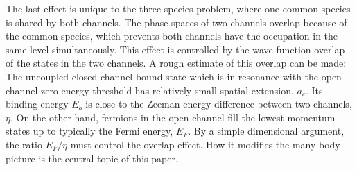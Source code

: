 \documentclass[reprint,pra]{revtex4-1}
\providecommand{\abs}[1]{\ensuremath{\left\lvert{#1}\right\rvert}}
\begin{document}
The last effect is unique to the three-species problem, where one common species is shared by both channels.  The phase spaces of two channels overlap because of  the common species, which prevents both channels have the occupation in the same  level simultaneously. This effect is controlled by the wave-function overlap of the states in the two channels. A rough estimate of this overlap can be made: The uncoupled closed-channel bound state which is in resonance with the open-channel zero energy threshold has  relatively small  spatial extension, $a_c$.  Its binding energy $E_b$ is close to the Zeeman energy difference between two channels, $\eta$.  On the other hand, fermions in the open channel fill the lowest  momentum states up to typically the Fermi energy, $E_F$.  By a simple dimensional argument, the ratio $E_F/\eta$ must control the overlap effect.   How it modifies the many-body picture is the central topic of this paper. 

\end{document}
